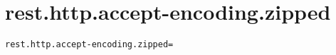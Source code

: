 \section{rest.http.accept-encoding.zipped}
\label{configuration:RestHttpAcceptEncodingZipped}
\AvailableInCsharpOnly{\TODO}
\begin{lstlisting}[style=Props,caption={Usage example for \textit{rest.http.accept-encoding.zipped}}]
rest.http.accept-encoding.zipped=
\end{lstlisting}